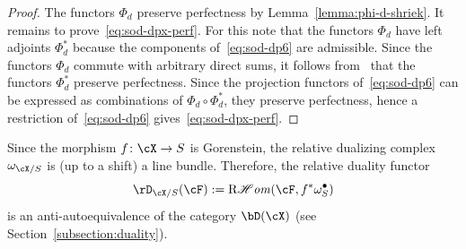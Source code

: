\documentclass[11pt]{amsart}
\DeclareMathOperator{\RCHom}{\mathrm{R}\mathscr{H}\mathit{om}}
\DeclareMathOperator{\Cone}{\mathrm{Cone}}
\theoremstyle{plain}
\theoremstyle{definition}
\theoremstyle{remark}
\begin{document}
\begin{proof}
The functors $\Phi_d$ preserve perfectness by Lemma~\ref{lemma:phi-d-shriek}.
It remains to prove~\eqref{eq:sod-dpx-perf}.
For this note that the functors $\Phi_d$ have left adjoints $\Phi_d^*$ because the components of~\eqref{eq:sod-dp6} are admissible.
Since the functors $\Phi_d$ commute with arbitrary direct sums, it follows from~\cite[Theorem~5.1]{neeman1996grothendieck}
that the functors $\Phi_d^*$ preserve perfectness.
Since the projection functors of~\eqref{eq:sod-dp6} can be expressed as combinations of $\Phi_d \circ \Phi_d^*$,
they preserve perfectness, hence a restriction of~\eqref{eq:sod-dp6} gives~\eqref{eq:sod-dpx-perf}.
% 
% 
% 
\end{proof}


Since the morphism $f \colon \cX \to S$ is Gorenstein, the relative dualizing complex $\omega_{\cX/S}$ is (up to a shift) a line bundle.
Therefore, the relative duality functor 
\begin{equation*}
\rD_{\cX/S}(\cF) := \RCHom(\cF , f^*\omega_S^\bullet)
\end{equation*}
is an anti-autoequivalence of the category $\bD(\cX)$ (see Section~\ref{subsection:duality}).
\end{document}
